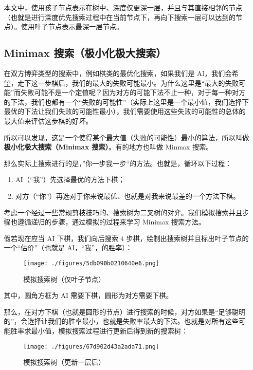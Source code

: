 

本文中，使用孩子节点表示在树中、深度仅更深一层，并且与其直接相邻的节点（也就是进行深度优先搜索过程中在当前节点下，再向下搜索一层可以达到的节点）。使用叶子节点表示最深一层节点。

\subsection{Minimax 搜索（极小化极大搜索）}
在双方博弈类型的搜索中，例如棋类的最优化搜索，如果我们是 AI，我们会希望，走下这一步棋后，我们的最大的失败可能最小。为什么这里是“最大的失败可能”而失败可能不是一个定值呢？因为对方的可能下法不止一种，对于每一种对方的下法，我们也都有一个“失败的可能性”（实际上这里是一个最小值，我们选择下最优的下法让我们失败的可能性最小），我们需要使用这些失败的可能性的总体的最大值来评估这步棋的好坏。

所以可以发现，这是一个使得某个最大值（失败的可能性）最小的算法，所以叫做\textbf{极小化极大搜索（Minimax 搜索）}。有的地方也叫做 Minmax 搜索。

那么实际上搜索进行的是，”你一步我一步“的方法。也就是，循环以下过程：
\begin{enumerate}
\item AI（“我”）先选择最优的方法下棋；
\item 对方（“你”）再选对于你来说最优、也就是对我来说最差的一个方法下棋。
\end{enumerate}
考虑一个经过一些常规剪枝技巧的、搜索树为二叉树的对弈。我们模拟搜索并且步骤也遵循递归的步骤，通过模拟的过程来学习 Minimax 搜索方法。

假若现在应当 AI 下棋，我们向后搜索 $4$ 步棋，绘制出搜索树并且标出叶子节点的一个“估价”（也就是 AI，“我”，的胜率）：
\begin{figure}[ht]
\centering
\texttt{[image: ./figures/5db090b0210640e6.png]}
\caption{模拟搜索树（仅叶子节点）} \label{fig_mmsab_1}
\end{figure}
其中，圆角方框为 AI 需要下棋，圆形为对方需要下棋。

那么，在对方下棋（也就是圆形的节点）进行搜索的时候，对方如果是“足够聪明的”，会选择让我们的胜率最小，也就是失败率最大的下法。也就是对所有这些可能胜率求最小值，模拟搜索过程进行更新后得到新的搜索树：
\begin{figure}[ht]
\centering
\texttt{[image: ./figures/67d902d43a2ada71.png]}
\caption{模拟搜索树（更新一层后）} \label{fig_mmsab_3}
\end{figure}

